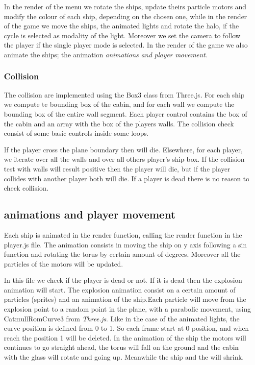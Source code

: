 \documentclass[11pt]{article}
\begin{document}
In the render of the menu we rotate the ships, update theirs particle motors and modify the colour of each ship, depending on the chosen one, while in the render of the game we move the ships, the animated lights and rotate the halo, if the cycle is selected as modality of the light. Moreover we set the camera to follow the player if the single player mode is selected. 
In the render of the game we also animate the ships; the animation \textit{animations and player movement}.

\subsubsection{Collision}
The collision are implemented using the Box3 class from Three.js.
For each ship we compute te bounding box of the cabin, and for each wall we compute the bounding box of the entire wall segment. 
Each player control contains the box of the cabin and an array with the box of the players walls.
The collision check consist of some basic controls inside some loops.

If the player cross the plane boundary then will die. Elsewhere, for each player, we iterate over all the walls and over all others player's ship box. If the collision test with walls will result positive then the player will die, but if the player collides with another player both will die.
If a player is dead there is no reason to check collision.

\subsection {animations and player movement}
Each ship is animated in the render function, calling the render function in the player.js file. The animation consists in moving the ship on y axis following a sin function and rotating the torus by certain amount of degrees. Moreover all the particles of the motors will be updated.

In this file we check if the player is dead or not. If it is dead then the explosion animation will start. The explosion animation consist on a certain amount of particles (sprites) and an animation of the ship.Each particle will move from the explosion point to a random point in the plane, with a parabolic movement, using CatmullRomCurve3 from \textit{Three.js}. Like in the case of the animated lights, the curve position is defined from 0 to 1. So each frame start at 0 position, and when reach the position 1 will be deleted. In the animation of the ship the motors will continues to go straight ahead, the torus will fall on the ground and the cabin with the glass will rotate and going up. Meanwhile the ship and the will shrink.
\end{document}
